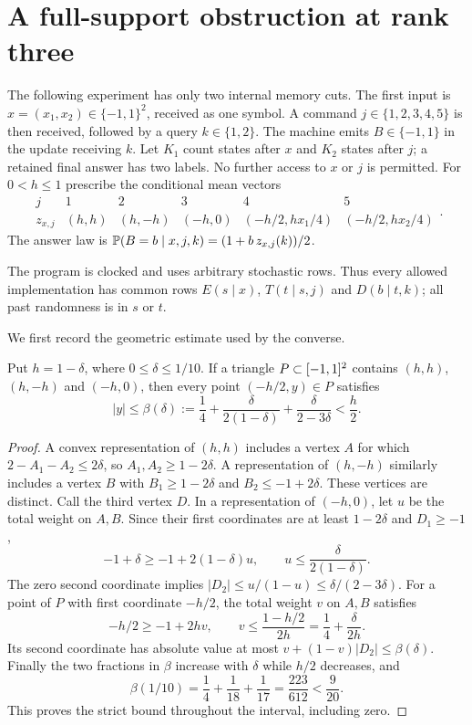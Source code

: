 \section{A full-support obstruction at rank three}
\label{sec:obstruction}
The following experiment has only two internal memory cuts. The first
input is $x=(x_1,x_2)\in\{-1,1\}^2$, received as one symbol. A command
$j\in\{1,2,3,4,5\}$ is then received, followed by a query $k\in\{1,2\}$.
The machine emits $B\in\{-1,1\}$ in the update receiving $k$. Let $K_1$
count states after $x$ and $K_2$ states after $j$; a retained final answer
has two labels. No further access to $x$ or $j$ is permitted. For
$0<h\le1$ prescribe the conditional mean vectors
\begin{equation}\label{eq:obstruction-array}
\begin{array}{c|ccccc}
j&1&2&3&4&5\\\hline
z_{x,j}&(h,h)&(h,-h)&(-h,0)&(-h/2,hx_1/4)&(-h/2,hx_2/4)
\end{array}.
\end{equation}
The answer law is $\mathbb P(B=b\mid x,j,k)=(1+b\,z_{x,j}(k))/2$.

The program is clocked and uses arbitrary stochastic rows. Thus every
allowed implementation has common rows $E(s\mid x)$, $T(t\mid s,j)$
and $D(b\mid t,k)$; all past randomness is in $s$ or $t$.

We first record the geometric estimate used by the converse.

\begin{lemma}
\label{lem:forced-triangle}
Put $h=1-\delta$, where $0\le\delta\le1/10$. If a triangle
$P\subset[-1,1]^2$ contains $(h,h)$, $(h,-h)$ and $(-h,0)$, then every
point $(-h/2,y)\in P$ satisfies
\begin{equation}\label{eq:beta}
 |y|\le\beta(\delta):=\frac14+\frac{\delta}{2(1-\delta)}
                      +\frac{\delta}{2-3\delta}<\frac h2.
\end{equation}
\end{lemma}
\begin{proof}
A convex representation of $(h,h)$ includes a vertex $A$ for which
$2-A_1-A_2\le2\delta$, so $A_1,A_2\ge1-2\delta$. A representation
of $(h,-h)$ similarly includes a vertex $B$ with
$B_1\ge1-2\delta$ and $B_2\le-1+2\delta$. These vertices are distinct.
Call the third vertex $D$. In a representation of $(-h,0)$, let $u$
be the total weight on $A,B$. Since their first coordinates are at
least $1-2\delta$ and $D_1\ge-1$,
\[
 -1+\delta\ge -1+2(1-\delta)u,
 \qquad u\le\frac{\delta}{2(1-\delta)}.
\]
The zero second coordinate implies
$|D_2|\le u/(1-u)\le\delta/(2-3\delta)$.
For a point of $P$ with first coordinate $-h/2$, the total weight $v$
on $A,B$ satisfies
\[
 -h/2\ge-1+2hv,
 \qquad v\le\frac{1-h/2}{2h}
               =\frac14+\frac{\delta}{2h}.
\]
Its second coordinate has absolute value at most
$v+(1-v)|D_2|\le\beta(\delta)$. Finally the two fractions in
$\beta$ increase with $\delta$ while $h/2$ decreases, and
\[
 \beta(1/10)=\frac14+\frac1{18}+\frac1{17}
             =\frac{223}{612}<\frac9{20}.
\]
This proves the strict bound throughout the interval, including zero.
\end{proof}


